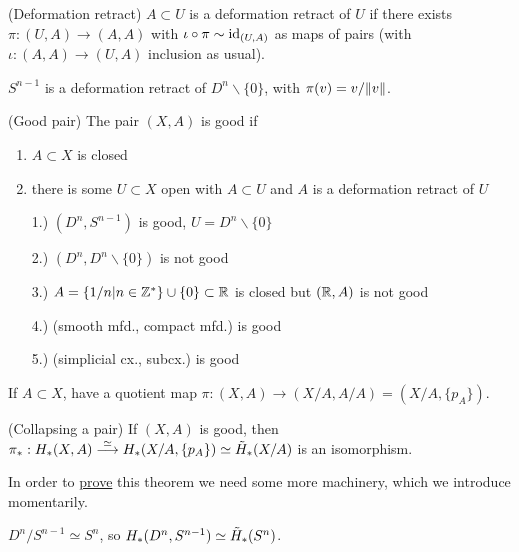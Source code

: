 \documentclass[a4paper,11pt]{article}
\begin{document}
				\begin{defi}(Deformation retract)
					$A\subset U$ is a deformation retract of $U$ if there exists $\pi:(U,A)\rightarrow (A,A)$ with $\iota\circ\pi\sim \operatorname{id}_{(U,A)}$ as maps of pairs (with $\iota:(A,A)\rightarrow (U,A)$ inclusion as usual). 
				\end{defi}

				\begin{eg}
					$S^{n-1}$ is a deformation retract of $D^n\backslash\{0\}$, with $\pi(v)=v/\norm{v}$.	
				\end{eg}

				\begin{defi}(Good pair)
					The pair $(X,A)$ is good if
					\begin{enumerate}
						\item $A\subset X$ is closed
						\item there is some $U\subset X$ open with $A\subset U$ and $A$ is a deformation retract of $U$
					\end{enumerate}
				\end{defi}

				\begin{eg}
					\begin{enumerate}
						\item [1.)]$(D^n,S^{n-1})$ is good, $U=D^n\backslash\{0\}$
						\item [2.)]$(D^n,D^n\backslash\{0\})$ is not good
						\item [3.)]$A=\{1/n|n\in\mathbb{Z}^\ast\}\cup\{0\}\subset\mathbb{R}$ is closed but $(\mathbb{R},A)$ is not good
						\item [4.)](smooth mfd., compact mfd.) is good
						\item [5.)](simplicial cx., subcx.) is good
					\end{enumerate}
				\end{eg}

				If $A\subset X$, have a quotient map $\pi:(X,A)\rightarrow (X/A,A/A)=(X/A,\{p_A\})$.

				\begin{thm}(Collapsing a pair)
					If $(X,A)$ is good, then $\pi_\ast:H_{\ast}(X,A)\overset{\simeq}{\longrightarrow}H_{\ast}(X/A,\{p_A\})\simeq\tilde{H}_{\ast}(X/A)$ is an isomorphism.
				\end{thm}

				In order to \hyperlink{proof-collapse}{prove} this theorem we need some more machinery, which we introduce momentarily.
				
				\begin{eg}
					$D^n/S^{n-1}\simeq S^n$, so $H_{\ast}(D^n,S^{n-1})\simeq\tilde{H}_{\ast}(S^n)$.
				\end{eg}
\end{document}
